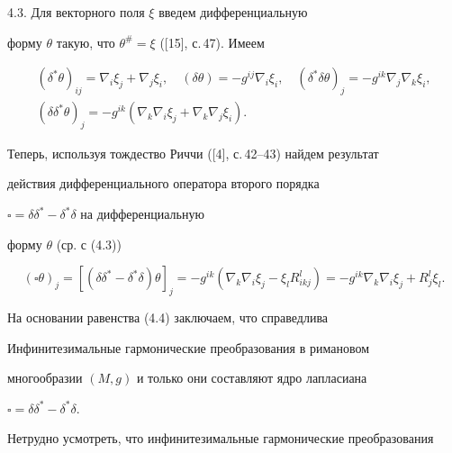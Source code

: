 4.3. Для векторного поля $\xi$ введем дифференциальную 


форму $\theta$ такую, что $\theta^{\#}=\xi$ ([15], с.\,47). Имеем 


\begin{gather*} 


(\delta^*\theta)_{ij}=\nabla_i\xi_j+\nabla_j\xi_i,\quad 


(\delta\theta)=-g^{ij}\nabla_i\xi_i,\quad 


(\delta^*\delta\theta)_j=-g^{ik}\nabla_j\nabla_k\xi_i,\\ 


% 


(\delta\delta^*\theta)_j=-g^{ik}(\nabla_k\nabla_i\xi_j+ 


\nabla_k\nabla_j\xi_i). 


\end{gather*} 


Теперь, используя тождество Риччи ([4], с.\,42--43) найдем результат 


действия дифференциального оператора второго порядка 


$\square=\delta\delta^*-\delta^*\delta$ на дифференциальную 


форму $\theta$ (ср. с (4.3)) 


\begin{equation} 


(\square\theta)_j=[(\delta\delta^*-\delta^*\delta) 


\theta]_j=-g^{ik}(\nabla_k\nabla_i\xi_j- 


\xi_l R^l_{ikj})=-g^{ik}\nabla_k\nabla_i\xi_j+ 


R^l_j\xi_l. 


\end{equation} 


На основании равенства (4.4) заключаем, что справедлива 


 


\begin{thms} 


Инфинитезимальные гармонические преобразования в римановом 


многообразии $(M,g)$ и только они составляют ядро лапласиана 


$\square=\delta\delta^*-\delta^*\delta$. 


\end{thms} 


 


Нетрудно усмотреть, что инфинитезимальные гармонические преобразования 


